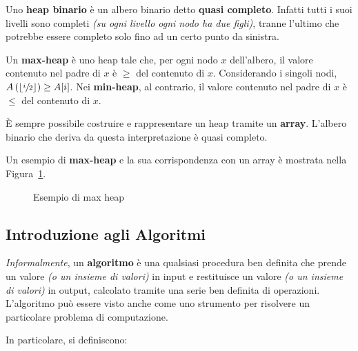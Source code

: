 \documentclass[italian, 10pt]{article}
\begin{document}
Uno \textbf{heap binario} è un albero binario detto \textbf{quasi completo}.
Infatti tutti i suoi livelli sono completi \textit{(su ogni livello ogni nodo ha due figli)}, tranne l'ultimo che potrebbe essere completo solo fino ad un certo punto da sinistra.

Un \textbf{max-heap} è uno heap tale che, per ogni nodo \(x\) dell'albero, il valore contenuto nel padre di \(x\) è \(\geq\) del contenuto di \(x\).
Considerando i singoli nodi, \(A\left(\left\lfloor\sfrac{i}{2}\right\rfloor\right) \geq A[i]\).
Nei \textbf{min-heap}, al contrario, il valore contenuto nel padre di \(x\) è \(\leq\) del contenuto di \(x\).

\bigskip
È sempre possibile costruire e rappresentare un heap tramite un \textbf{array}.
L'albero binario che deriva da questa interpretazione è quasi completo.

\bigskip
Un esempio di \textbf{max-heap} e la sua corrispondenza con un array è mostrata nella Figura~\ref{fig:esempio-di-max-heap}.

\begin{figure}[htbp]
  \bigskip
  \centering
  \caption{Esempio di max heap}
  \label{fig:esempio-di-max-heap}
  \bigskip
\end{figure}

\subsection{Introduzione agli Algoritmi}

\textit{Informalmente}, un \textbf{algoritmo} è una qualsiasi procedura ben definita che prende un valore \textit{(o un insieme di valori)} in input e restituisce un valore \textit{(o un insieme di valori)} in output, calcolato tramite una serie ben definita di operazioni.
L'algoritmo può essere visto anche come uno strumento per risolvere un particolare problema di computazione.

In particolare, si definiscono:
\end{document}
